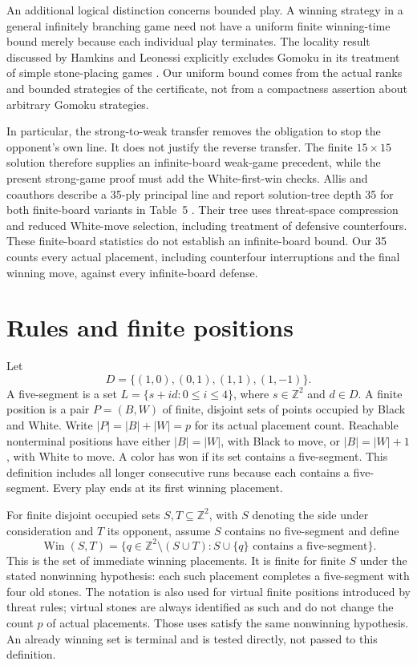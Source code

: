 \documentclass[11pt]{article}
\theoremstyle{definition}
\theoremstyle{remark}
\newcommand{\Z}{\mathbb Z}
\newcommand{\Win}{\operatorname{Win}}
\begin{document}
An additional logical distinction concerns bounded play. A winning strategy
in a general infinitely branching game need not have a uniform finite
winning-time bound merely because each individual play terminates. The
locality result discussed by Hamkins and Leonessi explicitly excludes Gomoku
in its treatment of simple stone-placing games \cite{Hamkins2023}. Our
uniform bound comes from the actual ranks and bounded strategies of the
certificate, not from a compactness assertion about arbitrary Gomoku
strategies.

In particular, the strong-to-weak transfer removes the obligation to stop
the opponent's own line. It does not justify the reverse transfer. The
finite $15\times15$ solution therefore supplies an infinite-board weak-game
precedent, while the present strong-game proof must add the White-first-win
checks. Allis and coauthors describe a 35-ply principal line and report
solution-tree depth 35 for both finite-board variants in Table~5
\cite{Allis1993}. Their tree uses threat-space compression and reduced
White-move selection, including treatment of defensive counterfours. These
finite-board statistics do not establish an infinite-board bound. Our 35
counts every actual placement, including counterfour interruptions and
the final winning move, against every infinite-board defense.

\section{Rules and finite positions}
\label{sec:rules}
Let
\[
 D=\{(1,0),(0,1),(1,1),(1,-1)\}.
\]
A five-segment is a set $L=\{s+id:0\leq i\leq4\}$, where $s\in\Z^2$
and $d\in D$. A finite position is a pair $P=(B,W)$ of finite, disjoint
sets of points occupied by Black and White. Write $|P|=|B|+|W|=p$ for
its actual placement count. Reachable nonterminal positions have either
$|B|=|W|$, with Black to move, or $|B|=|W|+1$, with White to move.
A color has won if its set contains a five-segment. This definition includes
all longer consecutive runs because each contains a five-segment.
Every play ends at its first winning placement.

For finite disjoint occupied sets $S,T\subseteq\Z^2$, with $S$ denoting
the side under consideration and $T$ its opponent, assume $S$ contains no
five-segment and define
\[
 \Win(S,T)=\{q\in\Z^2\setminus(S\cup T):
              S\cup\{q\}\text{ contains a five-segment}\}.
\]
This is the set of immediate winning placements. It is finite for finite
$S$ under the stated nonwinning hypothesis: each such placement completes
a five-segment with four old stones. The notation is also used for virtual
finite positions introduced by threat rules; virtual stones are always
identified as such and do not change the count $p$ of actual placements.
Those uses satisfy the same nonwinning hypothesis. An already winning set
is terminal and is tested directly, not passed to this definition.
\end{document}
